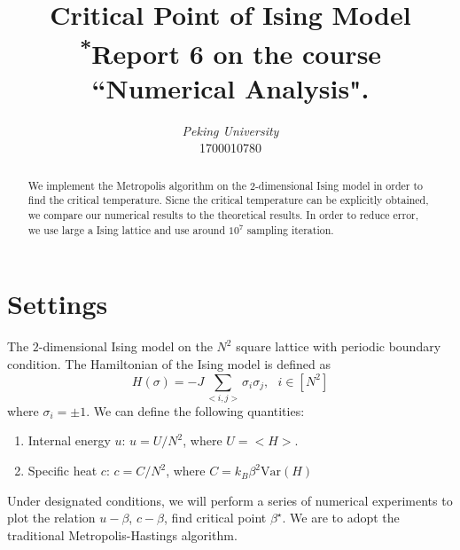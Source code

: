 \documentclass[conference,onecolumn,12pt]{IEEEtran}
\numberwithin{equation}{section}
\numberwithin{figure}{section}
\numberwithin{table}{section}
\theoremstyle{definition}
\begin{document}
\title{{Critical Point of Ising Model}\\
{\footnotesize \textsuperscript{*}Report 6 on the course ``Numerical Analysis".}
}

\author{
\textit{Peking University}\\
1700010780}

\maketitle


\begin{abstract}
	We implement the Metropolis algorithm on the 2-dimensional Ising model in order to find the critical temperature. Sicne the critical temperature can be explicitly obtained, we compare our numerical results to the theoretical results. In order to reduce error, we use large a Ising lattice and use around $10^7$ sampling iteration.
\end{abstract}

\thispagestyle{fancy} %
\lhead{} %
\chead{} %
\rhead{} %
\lfoot{} %
\cfoot{} %
\cfoot{\thepage} %
\renewcommand{\headrulewidth}{0pt} %
\renewcommand{\footrulewidth}{1pt} %
\pagestyle{fancy}
\cfoot{\thepage}
\tableofcontents
\section{Settings}
The $2$-dimensional Ising model on the $N^2$ square lattice with periodic
boundary condition. The Hamiltonian of the Ising model is defined
as
\begin{equation*}
    H(\sigma)=-J\sum_{<i,j>} \sigma_i \sigma_j,\ \ \ i\in [N^2]
\end{equation*}
where $\sigma_i= \pm 1$. We can define the following quantities:
\begin{enumerate}
    \item Internal energy $u$: 
    $u=U/{N^2}$, where $U = <H>$.
    \item Specific heat $c$: 
    $c = C/{N^2}$, where $C = k_B \beta^2 \mathrm{Var} (H)$
\end{enumerate}
Under designated conditions, we will perform a series of numerical experiments to plot the relation $u-\beta$, $c-\beta$, find critical point $\beta^\star$.
We are to adopt the traditional Metropolis-Hastings algorithm. 
\end{document}
